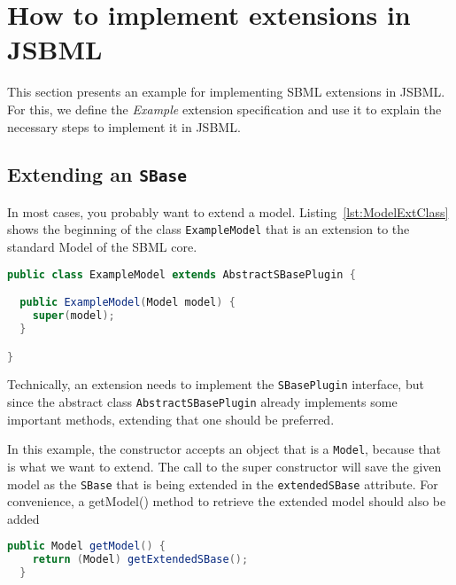 \section{How to implement extensions in JSBML}
\label{sec:howToExtension}

This section presents an example for implementing SBML extensions in JSBML.
For this, we define the \emph{Example} extension specification and use it to explain the necessary steps to implement it in JSBML.

\subsection{Extending an \texttt{SBase}}
\label{subsec:extendingSBase}

In most cases, you probably want to extend a model.
Listing~\vref{lst:ModelExtClass} shows the beginning of the class \texttt{ExampleModel} that is an extension to the standard Model of the SBML core.
\begin{lstlisting}[language=Java,caption={Extending \texttt{AbstractSBasePlugin}},label={lst:ModelExtClass}]
public class ExampleModel extends AbstractSBasePlugin {

  public ExampleModel(Model model) {
    super(model);
  }

}
\end{lstlisting}
Technically, an extension needs to implement the \texttt{SBasePlugin} interface,
but since the abstract class \texttt{AbstractSBasePlugin} already implements some important methods, extending that one should be preferred.

In this example, the constructor accepts an object that is a \texttt{Model}, because that is what we want to extend.
The call to the super constructor will save the given model as the \texttt{SBase} that is being extended in the \texttt{extendedSBase} attribute.
For convenience, a getModel() method to retrieve the extended model should also be added
\begin{lstlisting}[language=Java,caption={Convenience method to retrieve the extended model},label={lst:ModelExtGetModel}]
  public Model getModel() {
    return (Model) getExtendedSBase();
  }
\end{lstlisting}


